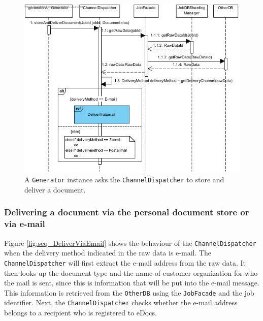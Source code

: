 \documentclass[a4paper,10pt]{article}
\begin{document}
\begin{figure}[!htp]
    \centering
    \includegraphics[width=\textwidth]{InitiateDocumentDelivery.png}
    \caption{A \texttt{Generator} instance asks the \texttt{ChannelDispatcher} to store and deliver a document.
        }\label{fig:seq_InitiateDocumentdelivery}
\end{figure}

\subsubsection{Delivering a document via the personal document store or via e-mail}
\label{scenario:DeliverDocPDS}
Figure \ref{fig:seq_DeliverViaEmail} shows the behaviour of the \texttt{ChannelDispatcher} when the delivery method indicated in the raw data is e-mail. The \texttt{ChannelDispatcher} will first extract the e-mail address from the raw data. It then looks up the document type and the name of customer organization for who the mail is sent, since this is information that will be put into the e-mail message. This information is retrieved from the \texttt{OtherDB} using the \texttt{JobFacade} and the job identifier. Next, the \texttt{ChannelDispatcher} checks whether the e-mail address belongs to a recipient who is registered to eDocs. \\
\end{document}
